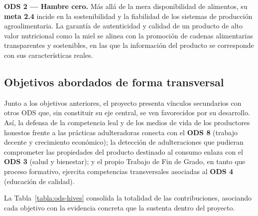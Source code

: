 \textbf{ODS 2 — Hambre cero.}
Más allá de la mera disponibilidad de alimentos, su \textbf{meta 2.4} incide en
la sostenibilidad y la fiabilidad de los sistemas de producción agroalimentaria.
La garantía de autenticidad y calidad de un producto de alto valor nutricional
como la miel se alinea con la promoción de cadenas alimentarias transparentes y
sostenibles, en las que la información del producto se corresponde con sus
características reales.
 
\subsection{Objetivos abordados de forma transversal}
 
Junto a los objetivos anteriores, el proyecto presenta vínculos secundarios con
otros ODS que, sin constituir su eje central, se ven favorecidos por su
desarrollo. Así, la defensa de la competencia leal y de los medios de vida de los
productores honestos frente a las prácticas adulteradoras conecta con el
\textbf{ODS 8} (trabajo decente y crecimiento económico); la detección de
adulteraciones que pudieran comprometer las propiedades del producto destinado al
consumo enlaza con el \textbf{ODS 3} (salud y bienestar); y el propio Trabajo de
Fin de Grado, en tanto que proceso formativo, ejercita competencias transversales
asociadas al \textbf{ODS 4} (educación de calidad).
 
La Tabla~\ref{tabla:ods-hives} consolida la totalidad de las contribuciones,
asociando cada objetivo con la evidencia concreta que la sustenta dentro del
proyecto.
 
